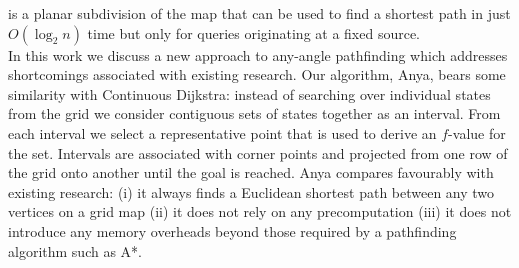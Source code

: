 is a planar subdivision of the map that can be used to find a shortest path in 
just $O(\log_{2}n)$ time but only for queries originating at a fixed source.
\\
In this work we discuss a new approach to any-angle pathfinding which
addresses shortcomings associated with existing research.
Our algorithm, Anya, bears some similarity with Continuous Dijkstra: 
instead of searching over individual states from the grid we consider
contiguous sets of states together as an interval. From each interval we select a 
representative point that is used to derive an $f$-value for the set.
Intervals are associated with corner points and projected from one 
row of the grid onto another until the goal is reached.
Anya compares favourably with existing research: (i)
it always finds a Euclidean shortest path between any two vertices on
a grid map (ii) it does not rely on any precomputation (iii) 
it does not introduce any memory overheads beyond those required by a 
pathfinding algorithm such as A*.

\newpage

